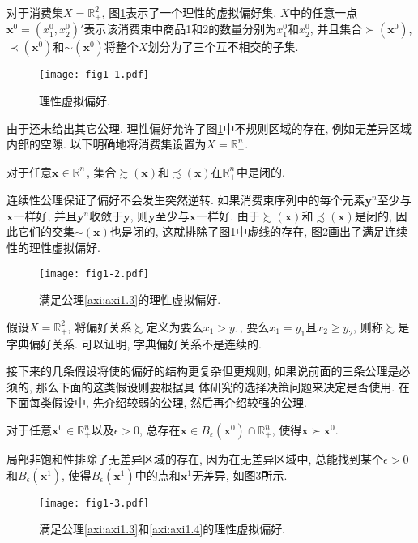 \documentclass[cn, 12pt, math=mtpro2, bibstyle=apa, blue]{elegantbook}
\newcommand{\R}{\mathbb{R}}
\newcommand{\x}{\mathbf{x}}
\begin{document}
对于消费集$X=\R_+^2$, 图\ref{fig1.1}表示了一个理性的虚拟偏好集, $X$中的任意一点$\x^0=(x_1^0,x_2^0)'$表示该消费束中商品1和2的数量分别为$x_1^0$和$x_2^0$, 并且集合$\succ(\x^0)$, $\prec(\x^0)$和$\sim(\x^0)$将整个$X$划分为了三个互不相交的子集.
\begin{figure}
  \centering
  \texttt{[image: fig1-1.pdf]}
  \caption{理性虚拟偏好.}\label{fig1.1}
\end{figure}

由于还未给出其它公理, 理性偏好允许了图\ref{fig1.1}中不规则区域的存在, 例如无差异区域内部的空隙. 以下明确地将消费集设置为$X=\R^n_+$.

\begin{axiom}[连续性]\label{axi:axi1.3}
对于任意$\x\in\R^n_+$, 集合$\succsim(\x)$和$\precsim(\x)$在$\R_+^n$中是闭的.
\end{axiom}
连续性公理保证了偏好不会发生突然逆转. 如果消费束序列中的每个元素$\mathbf{y}^n$至少与$\x$一样好, 并且$\mathbf{y}^n$收敛于$\mathbf{y}$, 则$\mathbf{y}$至少与$\x$一样好. 由于$\succsim(\x)$和$\precsim(\x)$是闭的, 因此它们的交集$\sim(\x)$也是闭的, 这就排除了图\ref{fig1.1}中虚线的存在, 图\ref{fig1.2}画出了满足连续性的理性虚拟偏好.

\begin{figure}[htbp!]
  \centering
  \texttt{[image: fig1-2.pdf]}
  \caption{满足公理\ref{axi:axi1.3}的理性虚拟偏好.}\label{fig1.2}
\end{figure}

\begin{example}[字典偏好关系]
假设$X=\R_+^2$, 将偏好关系$\succsim$定义为要么$x_1>y_1$, 要么$x_1=y_1$且$x_2\ge y_2$, 则称$\succsim$是字典偏好关系. 可以证明, 字典偏好关系不是连续的.
\end{example}

接下来的几条假设将使的偏好的结构更复杂但更规则, 如果说前面的三条公理是必须的, 那么下面的这类假设则要根据具 体研究的选择决策问题来决定是否使用. 在下面每类假设中, 先介绍较弱的公理, 然后再介绍较强的公理.

\begin{axiom}[局部非饱和性]\label{axi:axi1.4}
对于任意$\x^0\in\R^n_+$以及$\epsilon>0$, 总存在$\x\in B_\varepsilon(\x^0)\cap \R_+^n$, 使得$\x\succ\x^0$.
\end{axiom}
局部非饱和性排除了无差异区域的存在, 因为在无差异区域中, 总能找到某个$\epsilon>0$和$B_\epsilon(\x^1)$, 使得$B_\epsilon(\x^1)$中的点和$\x^1$无差异, 如图\ref{fig1.3}所示.
\begin{figure}
  \centering
  \texttt{[image: fig1-3.pdf]}
  \caption{满足公理\ref{axi:axi1.3}和\ref{axi:axi1.4}的理性虚拟偏好.}\label{fig1.3}
\end{figure}
\end{document}
